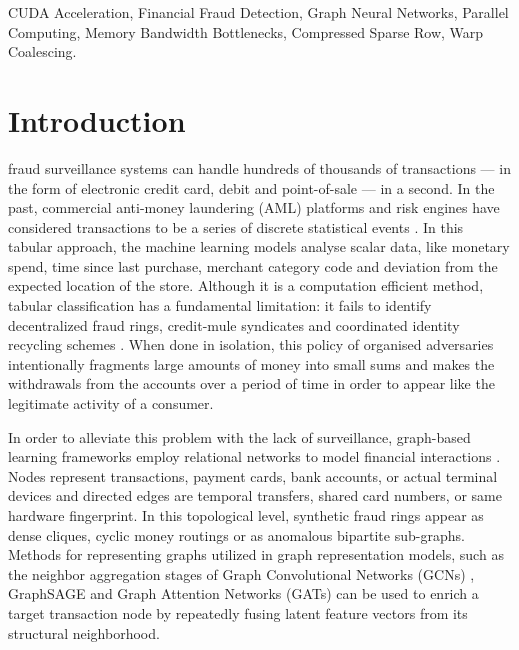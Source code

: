 \documentclass[journal]{IEEEtran}
\begin{document}
\begin{IEEEkeywords}
CUDA Acceleration, Financial Fraud Detection, Graph Neural Networks, Parallel Computing, Memory Bandwidth Bottlenecks, Compressed Sparse Row, Warp Coalescing.
\end{IEEEkeywords}

\section{Introduction}
 fraud surveillance systems can handle hundreds of thousands of transactions --- in the form of electronic credit card, debit and point-of-sale --- in a second. In the past, commercial anti-money laundering (AML) platforms and risk engines have considered transactions to be a series of discrete statistical events \cite{pourhabibi2020fraud}. In this tabular approach, the machine learning models analyse scalar data, like monetary spend, time since last purchase, merchant category code and deviation from the expected location of the store. Although it is a computation efficient method, tabular classification has a fundamental limitation: it fails to identify decentralized fraud rings, credit-mule syndicates and coordinated identity recycling schemes \cite{dou2020enhancing, liu2020alleviating}. When done in isolation, this policy of organised adversaries intentionally fragments large amounts of money into small sums and makes the withdrawals from the accounts over a period of time in order to appear like the legitimate activity of a consumer.

In order to alleviate this problem with the lack of surveillance, graph-based learning frameworks employ relational networks to model financial interactions \cite{akoglu2015graph, ma2021comprehensive}. Nodes represent transactions, payment cards, bank accounts, or actual terminal devices and directed edges are temporal transfers, shared card numbers, or same hardware fingerprint. In this topological level, synthetic fraud rings appear as dense cliques, cyclic money routings or as anomalous bipartite sub-graphs. Methods for representing graphs utilized in graph representation models, such as the neighbor aggregation stages of Graph Convolutional Networks (GCNs) \cite{kipf2017semi}, GraphSAGE \cite{hamilton2017inductive} and Graph Attention Networks (GATs) \cite{velickovic2018graph, fey2019fast} can be used to enrich a target transaction node by repeatedly fusing latent feature vectors from its structural neighborhood.
\end{document}
